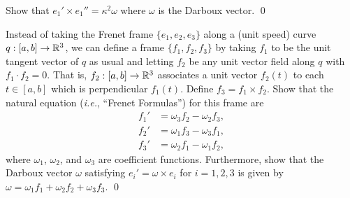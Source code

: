 \documentclass[12pt,twoside]{jarticle}
\begin{document}
\begin{question}
  Show that $e_1'\times e_1''=\kappa^2\omega$ where $\omega$ is the Darboux
  vector. \qed
\end{question}

\begin{question}\label{q:framef}
  Instead of taking the Frenet frame $\{e_1,e_2,e_3\}$ along a (unit speed)
  curve $q:[a,b]\to{\mathbb R}^3$, we can define a frame $\{f_1,f_2,f_3\}$ by taking
  $f_1$ to be the unit tangent vector of $q$ as usual and letting $f_2$ be
  any unit vector field along $q$ with $f_1\cdot f_2=0$. That is,
  $f_2:[a,b]\to{\mathbb R}^3$ associates a unit vector $f_2(t)$ to each $t\in[a,b]$
  which is perpendicular $f_1(t)$. Define $f_3=f_1\times f_2$. Show that the 
  natural equation ({\it i.e.}, ``Frenet Formulas'') for this frame are
  \begin{align*}
    f_1' & = \omega_3 f_2 - \omega_2 f_3, \\
    f_2' & = \omega_1 f_3 - \omega_3 f_1, \\
    f_3' & = \omega_2 f_1 - \omega_1 f_2,
  \end{align*}
  where $\omega_1$, $\omega_2$, and $\omega_3$ are coefficient functions.
  Furthermore, show that the Darboux vector $\omega$ satisfying
  $e_i'=\omega\times e_i$ for $i=1,2,3$ is given by
  $\omega=\omega_1f_1+\omega_2f_2+\omega_3f_3$.
  \qed
\end{question}
\end{document}
